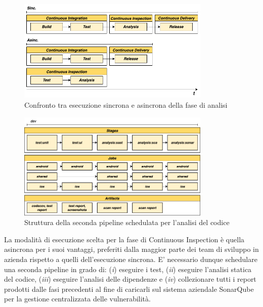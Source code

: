 \begin{figure}[H]
    \centering
    \includegraphics[width=0.82\textwidth]{img/inspection-sync-async.png}
    \caption{Confronto tra esecuzione sincrona e asincrona della fase di analisi}
    \label{inspection-sync-async}
\end{figure}

\begin{figure}[H]
    \centering
    \includegraphics[width=0.82\textwidth]{img/inspection-pipeline.png}
    \caption{Struttura della seconda pipeline schedulata per l'analisi del codice}
\end{figure}

La modalità di esecuzione scelta per la fase di Continuous Inspection è quella asincrona per i suoi vantaggi, preferiti dalla maggior parte dei team di sviluppo in azienda rispetto a quelli dell'esecuzione sincrona. E' necessario dunque schedulare una seconda pipeline in grado di: (\textit{i}) eseguire i test, (\textit{ii}) eseguire l'analisi statica del codice, (\textit{iii}) eseguire l'analisi delle dipendenze e (\textit{iv}) collezionare tutti i report prodotti dalle fasi precedenti al fine di caricarli sul sistema aziendale SonarQube per la gestione centralizzata delle vulnerabilità.